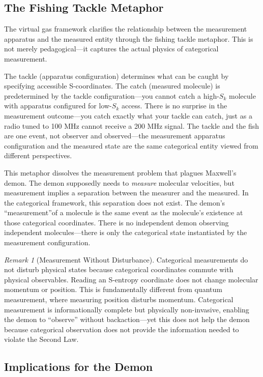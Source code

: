 \documentclass[12pt,a4paper]{article}
\theoremstyle{definition}
\theoremstyle{remark}
\newtheorem{remark}[theorem]{Remark}
\begin{document}
\subsection{The Fishing Tackle Metaphor}

The virtual gas framework clarifies the relationship between the measurement apparatus and the measured entity through the fishing tackle metaphor. This is not merely pedagogical—it captures the actual physics of categorical measurement.

The tackle (apparatus configuration) determines what can be caught by specifying accessible S-coordinates. The catch (measured molecule) is predetermined by the tackle configuration—you cannot catch a high-$S_k$ molecule with apparatus configured for low-$S_k$ access. There is no surprise in the measurement outcome—you catch exactly what your tackle can catch, just as a radio tuned to 100 MHz cannot receive a 200 MHz signal. The tackle and the fish are one event, not observer and observed—the measurement apparatus configuration and the measured state are the same categorical entity viewed from different perspectives.

This metaphor dissolves the measurement problem that plagues Maxwell's demon. The demon supposedly needs to \textit{measure} molecular velocities, but measurement implies a separation between the measurer and the measured. In the categorical framework, this separation does not exist. The demon's ``measurement''of a molecule is the same event as the molecule's existence at those categorical coordinates. There is no independent demon observing independent molecules—there is only the categorical state instantiated by the measurement configuration.

\begin{remark}[Measurement Without Disturbance]
\label{rem:measurement_without_disturbance}
Categorical measurements do not disturb physical states because categorical coordinates commute with physical observables. Reading an S-entropy coordinate does not change molecular momentum or position. This is fundamentally different from quantum measurement, where measuring position disturbs momentum. Categorical measurement is informationally complete but physically non-invasive, enabling the demon to ``observe'' without backaction—yet this does not help the demon because categorical observation does not provide the information needed to violate the Second Law.
\end{remark}

\subsection{Implications for the Demon}
\end{document}
